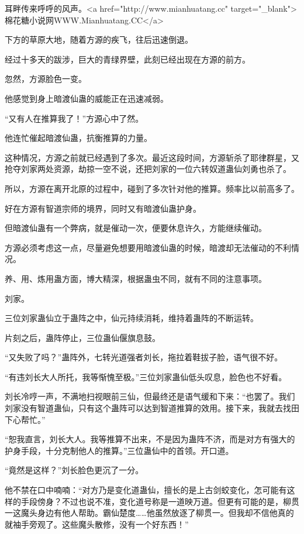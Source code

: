 
\begin{this_body}

耳畔传来呼呼的风声。<a href="http://www.mianhuatang.cc" target="\_blank">棉花糖小说网WWW.Mianhuatang.CC</a>

下方的草原大地，随着方源的疾飞，往后迅速倒退。

经过十多天的跋涉，巨大的青绿界壁，此刻已经出现在方源的前方。

忽然，方源脸色一变。

他感觉到身上暗渡仙蛊的威能正在迅速减弱。

“又有人在推算我了！”方源心中了然。

他连忙催起暗渡仙蛊，抗衡推算的力量。

这种情况，方源之前就已经遇到了多次。最近这段时间，方源斩杀了耶律群星，又抢夺刘家两处资源，劫掠一空不说，还把刘家的一位六转奴道蛊仙刘勇也杀了。

所以，方源在离开北原的过程中，碰到了多次针对他的推算。频率比以前高多了。

好在方源有智道宗师的境界，同时又有暗渡仙蛊护身。

但暗渡仙蛊有一个弊病，就是催动一次，便要休息许久，方能继续催动。

方源必须考虑这一点，尽量避免想要用暗渡仙蛊的时候，暗渡却无法催动的不利情况。

养、用、炼用蛊方面，博大精深，根据蛊虫不同，就有不同的注意事项。

刘家。

三位刘家蛊仙立于蛊阵之中，仙元持续消耗，维持着蛊阵的不断运转。

片刻之后，蛊阵停止，三位蛊仙偃旗息鼓。

“又失败了吗？”蛊阵外，七转光道强者刘长，拖拉着鞋拔子脸，语气很不好。

“有违刘长大人所托，我等惭愧至极。”三位刘家蛊仙低头叹息，脸色也不好看。

刘长冷哼一声，不满地扫视眼前三仙，但最终还是语气缓和下来：“也罢了。我们刘家没有智道蛊仙，只有这个蛊阵可以达到智道推算的效用。接下来，我就去找田下心帮忙。”

“恕我直言，刘长大人。我等推算不出来，不是因为蛊阵不济，而是对方有强大的护身手段，十分克制他人的推算。”三位蛊仙中的首领。开口道。

“竟然是这样？”刘长脸色更沉了一分。

他不禁在口中喃喃：“对方乃是变化道蛊仙，擅长的是上古剑蛟变化，怎可能有这样的手段傍身？不过也说不准，变化道号称是一道映万道。但更有可能的是，柳贯一这魔头身边有他人帮助。霸仙楚度……他虽然放逐了柳贯一。但我却不信他真的就袖手旁观了。这些魔头散修，没有一个好东西！”


\end{this_body}

